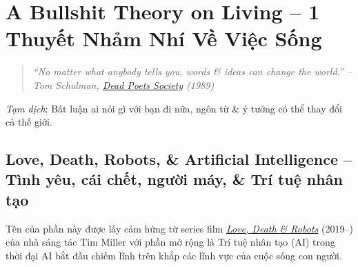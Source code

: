 \documentclass[12pt]{article}
\begin{document}

\section{A Bullshit Theory on Living -- 1 Thuyết Nhảm Nhí Về Việc Sống}
\label{sect: bullshit theory on live}

\begin{quotation}\it
	``No matter what anybody tells you, words \& ideas can change the world.'' -- {\sc Tom Schulman}, \href{https://www.imdb.com/title/tt0097165}{Dead Poets Society} (1989)
\end{quotation}
{\it Tạm dịch}: Bất luận ai nói gì với bạn đi nữa, ngôn từ \& ý tưởng có thể thay đổi cả thế giới.

\subsection{Love, Death, Robots, \& Artificial Intelligence -- Tình yêu, cái chết, người máy, \& Trí tuệ nhân tạo}
Tên của phần này được lấy cảm hứng từ series film \href{https://www.imdb.com/title/tt9561862}{\it Love, Death \& Robots} (2019--) của nhà sáng tác {\sc Tim Miller} với phần mở rộng là Trí tuệ nhân tạo (AI) trong thời đại AI bắt đầu chiếm lĩnh trên khắp các lĩnh vực của cuộc sống con người.
\end{document}

